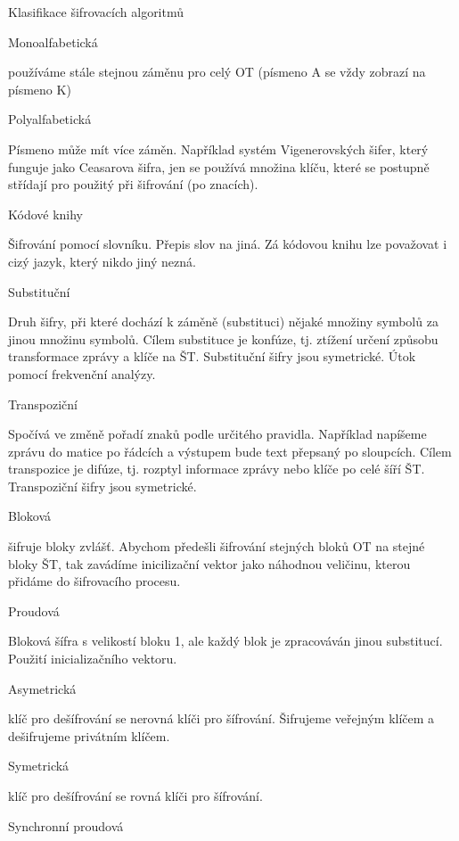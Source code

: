 
\chyph

\typosize[12/14]

\def\lc{\left\lfloor}   
\def\rc{\right\rfloor}

\chap Klasifikace šifrovacích algoritmů

\sec Monoalfabetická

používáme stále stejnou záměnu pro celý OT (písmeno A se vždy zobrazí na písmeno K)

\sec Polyalfabetická

Písmeno může mít více záměn. Například systém Vigenerovských šifer, který funguje jako Ceasarova šifra, jen se používá množina klíču, které se postupně střídají pro použitý při šifrování (po znacích).

\sec Kódové knihy

Šifrování pomocí slovníku. Přepis slov na jiná. Zá kódovou knihu lze považovat i cizý jazyk, který nikdo jiný nezná.

\sec Substituční

Druh šifry, při které dochází k záměně (substituci) nějaké množiny symbolů za jinou množinu symbolů. 
Cílem substituce je konfúze, tj. ztížení určení způsobu transformace zprávy a klíče na ŠT.
Substituční šifry jsou symetrické.
Útok pomocí frekvenční analýzy.

\sec Transpoziční

Spočívá ve změně pořadí znaků podle určitého pravidla. Například napíšeme zprávu do matice po řádcích a výstupem bude text přepsaný po sloupcích. 
Cílem transpozice je difúze, tj. rozptyl informace zprávy nebo klíče po celé šíří ŠT.
Transpoziční šifry jsou symetrické.

\sec Bloková

šifruje bloky zvlášť. Abychom předešli šifrování stejných bloků OT na stejné bloky ŠT, tak zavádíme inicilizační vektor jako náhodnou veličinu, kterou přidáme do šifrovacího procesu.

\sec Proudová

Bloková šífra s velikostí bloku 1, ale každý blok je zpracováván jinou substitucí. Použití inicializačního vektoru. 

\sec Asymetrická

klíč pro dešífrování se nerovná klíči pro šífrování. Šifrujeme veřejným klíčem a dešifrujeme privátním klíčem.

\sec Symetrická 

klíč pro dešífrování se rovná klíči pro šífrování.

\sec Synchronní proudová

